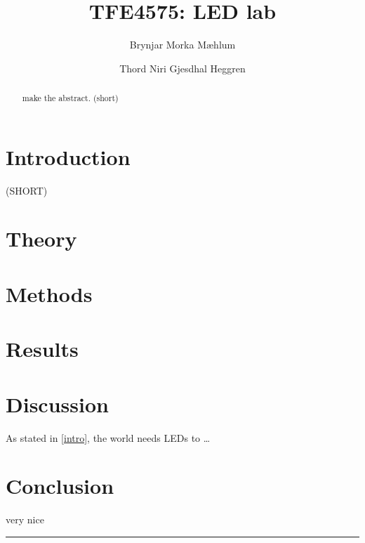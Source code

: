 \documentclass[5p,sort&compress]{elsarticle}
\begin{document}
\begin{frontmatter}

  \title{TFE4575: LED lab}

  \author[fysikk]{Brynjar Morka Mæhlum}
  \author[fysikk]{Thord Niri Gjesdhal Heggren}
  \address[fysikk]{Department of Physics, Norwegian University of Science and Technology, 7491 Trondheim, Norway.}

  \begin{abstract}

    \noindent make the abstract. (short)

  \end{abstract}


\end{frontmatter}

{ %
\hypersetup{linkcolor=purple}

\tableofcontents


\section{Introduction}
\label{intro}
(SHORT)



\section{Theory}
\label{theory}



\section{Methods}
\label{methods}




\section{Results}
\label{results}


\section{Discussion}
\label{discussion}

As stated in \autoref{intro}, the world needs LEDs to \dots


\section{Conclusion}
\label{conclusion}

\noindent very nice \cite{referanse_test}

}
\begingroup
\begin{center}
  \rule{2cm}{.4pt}
\end{center}
\makeatletter
{}
\makeatother



\endgroup
\end{document}
